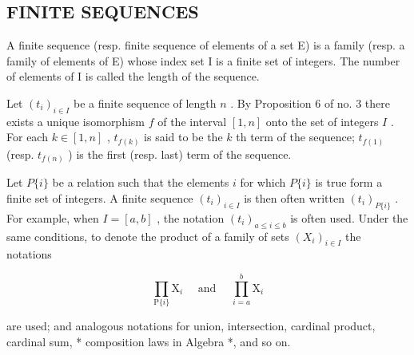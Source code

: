 \subsection{FINITE SEQUENCES}

A finite sequence (resp. finite sequence of elements of a set E) is a family (resp. a family of elements of E) whose index set I is a finite set of integers. The number of elements of I is called the length of the sequence.

Let \((t_i)_{i \in I}\) be a finite sequence of length \(n\) . By Proposition 6 of no. 3 there exists a unique isomorphism \(f\) of the interval \([1, n]\) onto the set of integers \(I\) . For each \(k \in [1, n]\) , \(t_{f(k)}\) is said to be the \(k\) th term of the sequence; \(t_{f(1)}\) (resp. \(t_{f(n)}\) ) is the first (resp. last) term of the sequence.

Let \(P\{i\}\) be a relation such that the elements \(i\) for which \(P\{i\}\) is true form a finite set of integers. A finite sequence \((t_i)_{i \in I}\) is then often written \((t_i)_{P\{i\}}\) . For example, when \(I = [a, b]\) , the notation \((t_i)_{a \leqslant i \leqslant b}\) is often used. Under the same conditions, to denote the product of a family of sets \((X_i)_{i \in I}\) the notations

\[
\prod_ {\mathrm{P} \{i \}} \mathrm{X} _ {i} \quad \text { and } \quad \prod_ {i = a} ^ {b} \mathrm{X} _ {i}
\]

are used; and analogous notations for union, intersection, cardinal product, cardinal sum, * composition laws in Algebra *, and so on.

